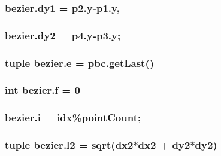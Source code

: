 \subsubsection[{dy1}]{\setlength{\rightskip}{0pt plus 5cm}bezier.\+dy1 = p2.\+y-\/p1.\+y,}\label{namespacebezier_a2863af6e4685d9fce5c5669231ec503e}
\hypertarget{namespacebezier_af0ca6962c8c3be669e5b74235ab11d9e}{}
\subsubsection[{dy2}]{\setlength{\rightskip}{0pt plus 5cm}bezier.\+dy2 = p4.\+y-\/p3.\+y;}\label{namespacebezier_af0ca6962c8c3be669e5b74235ab11d9e}
\hypertarget{namespacebezier_ab351668ea604cb148440efa1ea7db562}{}
\subsubsection[{e}]{\setlength{\rightskip}{0pt plus 5cm}tuple bezier.\+e = pbc.\+get\+Last()}\label{namespacebezier_ab351668ea604cb148440efa1ea7db562}
\hypertarget{namespacebezier_ad649969fef81af63abc92b1015251242}{}
\subsubsection[{f}]{\setlength{\rightskip}{0pt plus 5cm}int bezier.\+f = 0}\label{namespacebezier_ad649969fef81af63abc92b1015251242}
\hypertarget{namespacebezier_a928e2d96e49d7898d0f47903caf0f866}{}
\subsubsection[{i}]{\setlength{\rightskip}{0pt plus 5cm}bezier.\+i = idx\%point\+Count;}\label{namespacebezier_a928e2d96e49d7898d0f47903caf0f866}
\hypertarget{namespacebezier_aaf2772c5a20e34fa95649b49addf2e96}{}
\subsubsection[{l2}]{\setlength{\rightskip}{0pt plus 5cm}tuple bezier.\+l2 = sqrt({\bf dx2}$\ast${\bf dx2} + {\bf dy2}$\ast${\bf dy2})}\label{namespacebezier_aaf2772c5a20e34fa95649b49addf2e96}
\hypertarget{namespacebezier_ad3e176f900e0e892b1621ab09241ca08}{}
